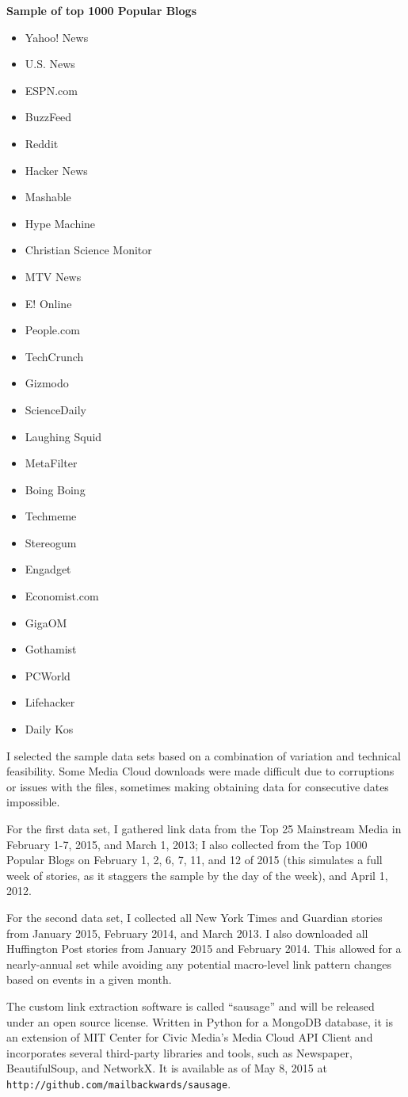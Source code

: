 \textbf{Sample of top 1000 Popular Blogs}\begin{itemize}
\item Yahoo! News
\item U.S. News
\item ESPN.com
\item BuzzFeed
\item Reddit
\item Hacker News
\item Mashable
\item Hype Machine
\item Christian Science Monitor
\item MTV News
\item E! Online
\item People.com
\item TechCrunch
\item Gizmodo
\item ScienceDaily
\item Laughing Squid
\item MetaFilter
\item Boing Boing
\item Techmeme
\item Stereogum
\item Engadget
\item Economist.com
\item GigaOM
\item Gothamist
\item PCWorld
\item Lifehacker
\item Daily Kos\end{itemize}

I selected the sample data sets based on a combination of variation and technical feasibility. Some Media Cloud downloads were made difficult due to corruptions or issues with the files, sometimes making obtaining data for consecutive dates impossible.

For the first data set, I gathered link data from the Top 25 Mainstream Media in February 1-7, 2015, and March 1, 2013; I also collected from the Top 1000 Popular Blogs on February 1, 2, 6, 7, 11, and 12 of 2015 (this simulates a full week of stories, as it staggers the sample by the day of the week), and April 1, 2012.

For the second data set, I collected all New York Times and Guardian stories from January 2015, February 2014, and March 2013. I also downloaded all Huffington Post stories from January 2015 and February 2014. This allowed for a nearly-annual set while avoiding any potential macro-level link pattern changes based on events in a given month.

The custom link extraction software is called ``sausage'' and will be released under an open source license. Written in Python for a MongoDB database, it is an extension of MIT Center for Civic Media's Media Cloud API Client and incorporates several third-party libraries and tools, such as Newspaper, BeautifulSoup, and NetworkX. It is available as of May 8, 2015 at \texttt{http://github.com/mailbackwards/sausage}.

\clearpage
\newpage
